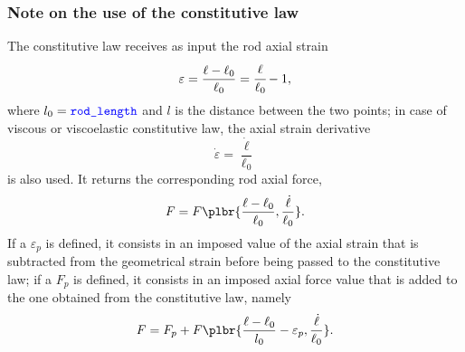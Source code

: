 \subsubsection{Note on the use of the constitutive law}
The constitutive law  receives as input the rod axial strain
\begin{equation}
	\varepsilon = \frac{\ell - \ell_0}{\ell_0} = \cfrac{\ell}{\ell_0} - 1 ,
\end{equation}
where $l_0=\textcolor{blue}{\texttt{rod\_length}}$ and $l$ is the distance between the two points;
in case of viscous or viscoelastic constitutive law, the axial strain derivative
\begin{equation}
	\dot{\varepsilon} = \frac{\dot{\ell}}{\ell_0}
\end{equation}
is also used.
It returns the corresponding rod axial force,
\begin{displaymath}
	F = F\plbr{\frac{\ell - \ell_0}{\ell_0}, \frac{\dot{\ell}}{\ell_0}} .
\end{displaymath}
If a  $\varepsilon_p$ is defined,
it consists in an imposed value of the axial strain
that is subtracted from the geometrical strain
before being passed to the constitutive law;
if a  $F_p$ is defined,
it consists in an imposed axial force value
that is added to the one obtained from the constitutive law,
namely
\begin{displaymath}
	F = F_p + F\plbr{\frac{\ell - \ell_0}{l_0} - \varepsilon_p, \frac{\dot{\ell}}{\ell_0}} .
\end{displaymath}

